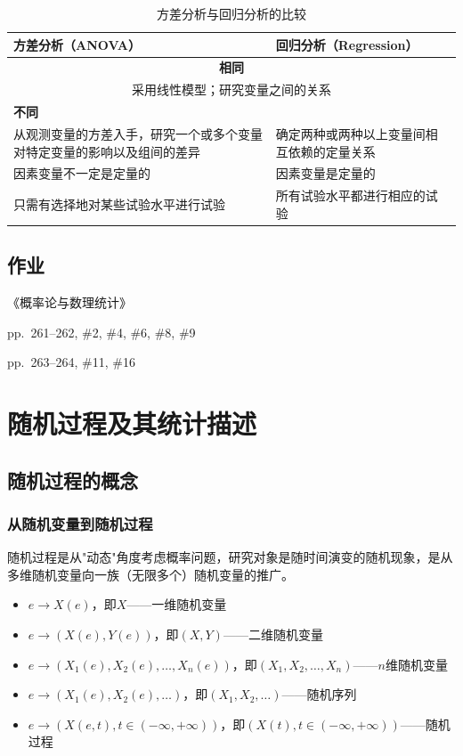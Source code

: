 \documentclass[11pt,a4paper]{report}
\theoremstyle{definition}
\begin{document}
\begin{table}[htbp]
\centering
\caption{方差分析与回归分析的比较}
\begin{tabular}{@{}p{6cm}p{6cm}@{}}
\toprule
\textbf{方差分析（ANOVA）} & \textbf{回归分析（Regression）} \\
\midrule
\multicolumn{2}{c}{\textbf{相同}} \\
\multicolumn{2}{c}{采用线性模型；研究变量之间的关系} \\
\midrule
\textbf{不同} & \\
从观测变量的方差入手，研究一个或多个变量对特定变量的影响以及组间的差异 & 确定两种或两种以上变量间相互依赖的定量关系 \\
因素变量不一定是定量的 & 因素变量是定量的 \\
只需有选择地对某些试验水平进行试验 & 所有试验水平都进行相应的试验 \\
\bottomrule
\end{tabular}
\end{table}

\section*{作业}

《概率论与数理统计》

pp.~261--262, \#2, \#4, \#6, \#8, \#9

pp.~263--264, \#11, \#16

\newpage
\chapter{随机过程及其统计描述}

\section{随机过程的概念}

\subsection{从随机变量到随机过程}

随机过程是从"动态"角度考虑概率问题，研究对象是随时间演变的随机现象，是从多维随机变量向一族（无限多个）随机变量的推广。

\begin{itemize}[leftmargin=2em]
    \item $e \to X(e)$，即$X$——一维随机变量
    \item $e \to (X(e),Y(e))$，即$(X,Y)$——二维随机变量
    \item $e \to (X_1(e),X_2(e),\ldots,X_n(e))$，即$(X_1,X_2,\ldots,X_n)$——$n$维随机变量
    \item $e \to (X_1(e),X_2(e),\ldots)$，即$(X_1,X_2,\ldots)$——随机序列
    \item $e \to (X(e,t),t\in(-\infty,+\infty))$，即$(X(t),t\in(-\infty,+\infty))$——随机过程
\end{itemize}
\end{document}
